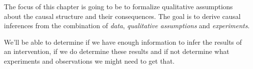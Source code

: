 The focus of this chapter is going to be to formalize qualitative assumptions about the causal structure and their consequences. The goal is to derive causal inferences from the combination of \textit{data}, \textit{qualitative assumptions} and \textit{experiments}.

We'll be able to determine if we have enough information to infer the results of an intervention, if we do  determine these results and if not determine what experiments and observations we might need to get that.


